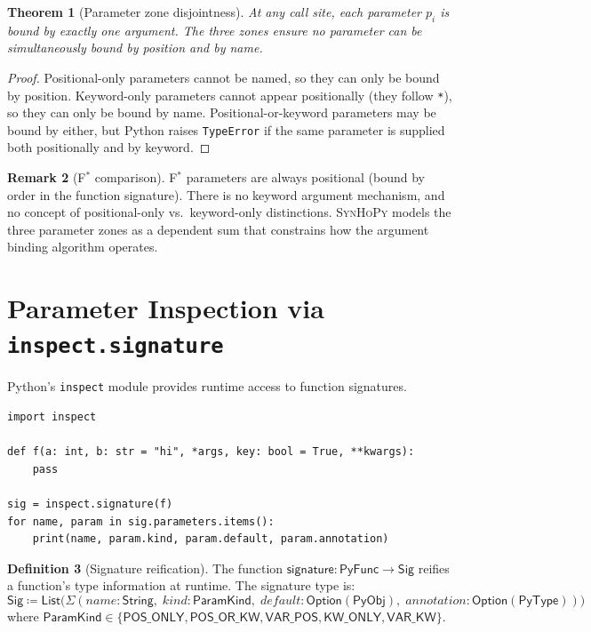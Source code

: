 \documentclass[11pt,a4paper]{report}
\theoremstyle{definition}
\newtheorem{definition}{Definition}[chapter]
\newtheorem{remark}[definition]{Remark}
\theoremstyle{plain}
\newtheorem{theorem}[definition]{Theorem}
\newcommand{\PyObj}{\mathsf{PyObj}}
\newcommand{\PyType}{\mathsf{PyType}}
\newcommand{\PyFunc}{\mathsf{PyFunc}}
\newcommand{\defeq}{\coloneqq}
\newcommand{\fstar}{F$^{*}$}
\newcommand{\synhopy}{\textsc{SynHoPy}}
\begin{document}
\begin{theorem}[Parameter zone disjointness]
\label{thm:param-zones}
At any call site, each parameter $p_i$ is bound by exactly one argument.
The three zones ensure no parameter can be simultaneously bound by position
and by name.
\end{theorem}
\begin{proof}
Positional-only parameters cannot be named, so they can only be bound by
position.  Keyword-only parameters cannot appear positionally (they follow
\texttt{*}), so they can only be bound by name.  Positional-or-keyword
parameters may be bound by either, but Python raises
\lstinline[style=python]{TypeError} if the same parameter is supplied both
positionally and by keyword.
\end{proof}

\begin{remark}[\fstar{} comparison]
\fstar{} parameters are always positional (bound by order in the function
signature).  There is no keyword argument mechanism, and no concept of
positional-only vs.\ keyword-only distinctions.  \synhopy{} models the
three parameter zones as a dependent sum that constrains how the argument
binding algorithm operates.
\end{remark}

\section{Parameter Inspection via \texttt{inspect.signature}}

Python's \lstinline[style=python]{inspect} module provides runtime access
to function signatures.

\begin{lstlisting}[style=python]
import inspect

def f(a: int, b: str = "hi", *args, key: bool = True, **kwargs):
    pass

sig = inspect.signature(f)
for name, param in sig.parameters.items():
    print(name, param.kind, param.default, param.annotation)
\end{lstlisting}

\begin{definition}[Signature reification]
\label{def:sig-reify}
The function $\mathsf{signature} : \PyFunc \to \mathsf{Sig}$ reifies
a function's type information at runtime.  The signature type is:
\[
  \mathsf{Sig} \defeq \mathsf{List}\bigl(
    \Sigma(\mathit{name} : \mathsf{String},\;
           \mathit{kind} : \mathsf{ParamKind},\;
           \mathit{default} : \mathsf{Option}(\PyObj),\;
           \mathit{annotation} : \mathsf{Option}(\PyType))
  \bigr)
\]
where $\mathsf{ParamKind} \in \{
  \mathsf{POS\_ONLY}, \mathsf{POS\_OR\_KW}, \mathsf{VAR\_POS},
  \mathsf{KW\_ONLY}, \mathsf{VAR\_KW}
\}$.
\end{definition}
\end{document}
